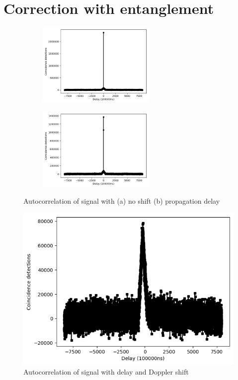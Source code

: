 \section{Correction with entanglement}

\begin{figure}[ht!]
	\centering
	\begin{subfigure}[t]{0.49\linewidth}
		\centering
		\includegraphics[height=4cm]{assets/unshifted_cc.png}
		\subcaption{}
	\end{subfigure}
	\begin{subfigure}[t]{0.49\textwidth}
		\centering
		\includegraphics[height=4cm]{assets/firstDoppler_cc.png}
		\subcaption{}
	\end{subfigure}
	\caption{Autocorrelation of signal with (a) no shift (b) propagation delay}
	\label{fig:firstDoppler_cc}
\end{figure}
\begin{figure}[ht!]
	\centering
	\includegraphics[width=0.95\linewidth]{assets/secondDoppler_cc.png}
	\caption{Autocorrelation of signal with delay and Doppler shift}
	\label{fig:secondDoppler_cc}
\end{figure}

